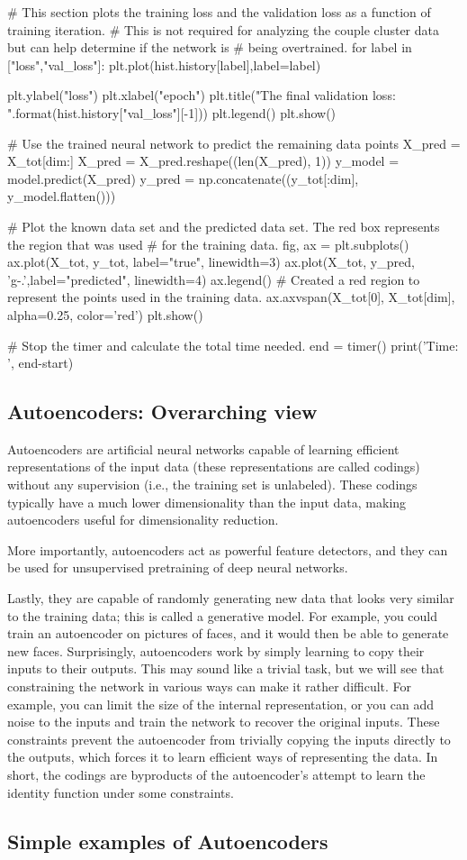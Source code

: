 \documentclass[%
oneside,                 %
final,                   %
10pt]{article}
\begin{document}
# This section plots the training loss and the validation loss as a function of training iteration.
# This is not required for analyzing the couple cluster data but can help determine if the network is
# being overtrained.
for label in ["loss","val_loss"]:
    plt.plot(hist.history[label],label=label)

plt.ylabel("loss")
plt.xlabel("epoch")
plt.title("The final validation loss: {}".format(hist.history["val_loss"][-1]))
plt.legend()
plt.show()

# Use the trained neural network to predict the remaining data points
X_pred = X_tot[dim:]
X_pred = X_pred.reshape((len(X_pred), 1))
y_model = model.predict(X_pred)
y_pred = np.concatenate((y_tot[:dim], y_model.flatten()))

# Plot the known data set and the predicted data set.  The red box represents the region that was used
# for the training data.
fig, ax = plt.subplots()
ax.plot(X_tot, y_tot, label="true", linewidth=3)
ax.plot(X_tot, y_pred, 'g-.',label="predicted", linewidth=4)
ax.legend()
# Created a red region to represent the points used in the training data.
ax.axvspan(X_tot[0], X_tot[dim], alpha=0.25, color='red')
plt.show()

# Stop the timer and calculate the total time needed.
end = timer()
print('Time: ', end-start)


\epycod


\subsection{Autoencoders: Overarching view}

Autoencoders are artificial neural networks capable of learning
efficient representations of the input data (these representations are called codings)  without
any supervision (i.e., the training set is unlabeled). These codings
typically have a much lower dimensionality than the input data, making
autoencoders useful for dimensionality reduction. 

More importantly, autoencoders act as powerful feature detectors, and
they can be used for unsupervised pretraining of deep neural networks.

Lastly, they are capable of randomly generating new data that looks
very similar to the training data; this is called a generative
model. For example, you could train an autoencoder on pictures of
faces, and it would then be able to generate new faces.  Surprisingly,
autoencoders work by simply learning to copy their inputs to their
outputs. This may sound like a trivial task, but we will see that
constraining the network in various ways can make it rather
difficult. For example, you can limit the size of the internal
representation, or you can add noise to the inputs and train the
network to recover the original inputs. These constraints prevent the
autoencoder from trivially copying the inputs directly to the outputs,
which forces it to learn efficient ways of representing the data. In
short, the codings are byproducts of the autoencoder’s attempt to
learn the identity function under some constraints.

\subsection{Simple examples of Autoencoders}



\end{document}
